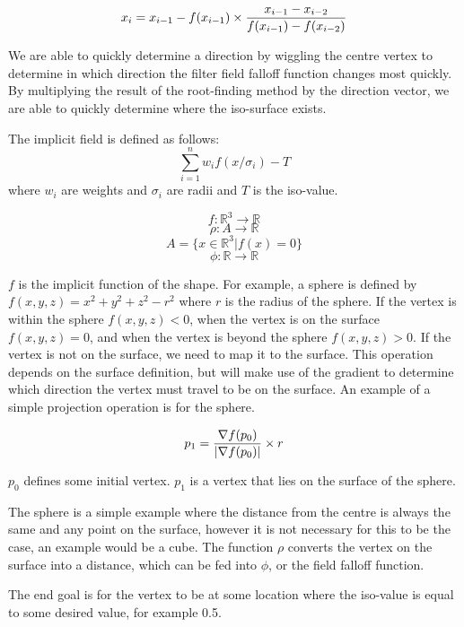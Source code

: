 \documentclass[conference]{acmsiggraph}
\begin{document}
$$x_i = x_{i-1} - f(x_{i-1}) \times {{x_{i-1} - x_{i-2}}\over{f(x_{i-1}) -
f(x_{i-2})}}$$

We are able to quickly determine a direction by wiggling
the centre vertex to determine in which direction the filter field falloff
function changes most quickly. By multiplying the result of the root-finding
method by the direction vector, we are able to quickly determine where the
iso-surface exists.

The implicit field is defined as follows:
$$\sum\limits_{i=1}^n w_i f(x / \sigma_i ) - T$$
where $w_i$ are weights and $\sigma_i$ are radii and $T$ is the iso-value.

$$f : \mathbb{R}^3 \rightarrow \mathbb{R}$$
$$\rho : A \rightarrow \mathbb{R} $$
$$A = \{x \in \mathbb{R}^3 | f(x) = 0\}$$
$$\phi : \mathbb{R} \rightarrow \mathbb{R}$$

$f$ is the implicit function of the shape. For example, a sphere is defined by
$f(x, y, z) = x^2 + y ^ 2 + z ^ 2 - r^2$ where $r$ is the radius of the sphere.
If the vertex is within the sphere $f(x, y, z) < 0$, when the vertex is on the
surface $f(x, y, z) = 0$, and when the vertex is beyond the sphere $f(x, y, z)
> 0$. If the vertex is not on the surface, we need to map it to the surface.
This operation depends on the surface definition, but will make use of the
gradient to determine which direction the vertex must travel to be on the
surface. An example of a simple projection operation is for the sphere.

$$p_1 = {\nabla f(p_0) \over |\nabla f(p_0)|} \times r$$

$p_0$ defines some initial vertex. $p_1$ is a vertex that lies on the surface
of the sphere.

The sphere is a simple example where the distance from the centre is always the
same and any point on the surface, however it is not necessary for this to be
the case, an example would be a cube. The function $\rho$ converts the vertex
on the surface into a distance, which can be fed into $\phi$, or the field
falloff function.

The end goal is for the vertex to be at some location where the iso-value is
equal to some desired value, for example 0.5.
\end{document}
